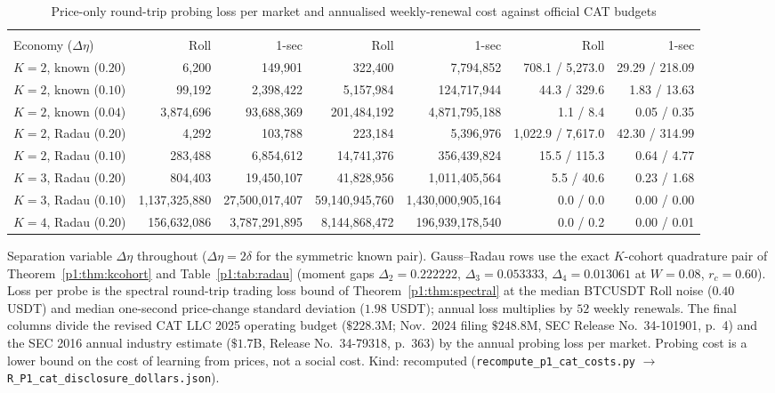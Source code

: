 \begin{table}[t]\centering\footnotesize
\begin{threeparttable}
\caption{Price-only round-trip probing loss per market and annualised weekly-renewal cost against official CAT budgets}\label{p1:tab:cat_dollars}
\setlength{\tabcolsep}{1.5pt}
\begin{tabular}{@{}>{\scriptsize}l*{6}{>{\scriptsize}r}@{}}
\toprule
 & \multicolumn{2}{c}{\scriptsize Loss / probe (USDT)} & \multicolumn{2}{c}{\scriptsize Annual ($52\times$, USDT)} & \multicolumn{2}{c}{\scriptsize Mkts ($\$228.3$M / $\$1.7$B)}\\
Economy ($\Delta\eta$) & Roll & 1-sec & Roll & 1-sec & Roll & 1-sec\\
\midrule
$K=2$, known ($0.20$) & 6{,}200 & 149{,}901 & 322{,}400 & 7{,}794{,}852 & 708.1 / 5{,}273.0 & 29.29 / 218.09\\
$K=2$, known ($0.10$) & 99{,}192 & 2{,}398{,}422 & 5{,}157{,}984 & 124{,}717{,}944 & 44.3 / 329.6 & 1.83 / 13.63\\
$K=2$, known ($0.04$) & 3{,}874{,}696 & 93{,}688{,}369 & 201{,}484{,}192 & 4{,}871{,}795{,}188 & 1.1 / 8.4 & 0.05 / 0.35\\
\midrule
$K=2$, Radau ($0.20$) & 4{,}292 & 103{,}788 & 223{,}184 & 5{,}396{,}976 & 1{,}022.9 / 7{,}617.0 & 42.30 / 314.99\\
$K=2$, Radau ($0.10$) & 283{,}488 & 6{,}854{,}612 & 14{,}741{,}376 & 356{,}439{,}824 & 15.5 / 115.3 & 0.64 / 4.77\\
$K=3$, Radau ($0.20$) & 804{,}403 & 19{,}450{,}107 & 41{,}828{,}956 & 1{,}011{,}405{,}564 & 5.5 / 40.6 & 0.23 / 1.68\\
$K=3$, Radau ($0.10$) & 1{,}137{,}325{,}880 & 27{,}500{,}017{,}407 & 59{,}140{,}945{,}760 & 1{,}430{,}000{,}905{,}164 & 0.0 / 0.0 & 0.00 / 0.00\\
$K=4$, Radau ($0.20$) & 156{,}632{,}086 & 3{,}787{,}291{,}895 & 8{,}144{,}868{,}472 & 196{,}939{,}178{,}540 & 0.0 / 0.2 & 0.00 / 0.01\\
\bottomrule
\end{tabular}
\begin{tablenotes}\footnotesize\item Separation variable $\Delta\eta$ throughout ($\Delta\eta=2\delta$ for the symmetric known pair). Gauss--Radau rows use the exact $K$-cohort quadrature pair of Theorem~\ref{p1:thm:kcohort} and Table~\ref{p1:tab:radau} (moment gaps $\Delta_2=0.222222$, $\Delta_3=0.053333$, $\Delta_4=0.013061$ at $W=0.08$, $r_c=0.60$). Loss per probe is the spectral round-trip trading loss bound of Theorem~\ref{p1:thm:spectral} at the median BTCUSDT Roll noise ($0.40$ USDT) and median one-second price-change standard deviation ($1.98$ USDT); annual loss multiplies by $52$ weekly renewals. The final columns divide the revised CAT LLC 2025 operating budget ($\$228.3$M; Nov.\ 2024 filing $\$248.8$M, SEC Release No.\ 34-101901, p.~4) and the SEC 2016 annual industry estimate ($\$1.7$B, Release No.\ 34-79318, p.~363) by the annual probing loss per market. Probing cost is a lower bound on the cost of learning from prices, not a social cost. Kind: recomputed (\texttt{recompute\_p1\_cat\_costs.py} $\to$ \texttt{R\_P1\_cat\_disclosure\_dollars.json}).\end{tablenotes}

\end{threeparttable}
\end{table}
